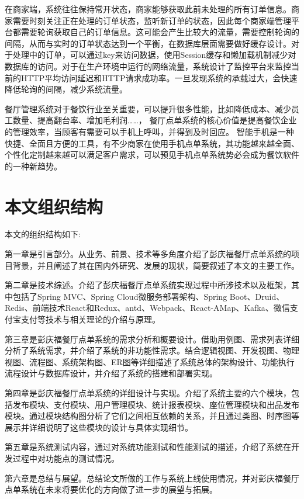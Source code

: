 在商家端，系统往往保持常开状态，商家能够获取此前未处理的所有订单信息。商家需要时刻关注正在处理的订单状态，监听新订单的状态，因此每个商家端管理平台都需要轮询获取自己的订单信息。这可能会产生比较大的流量，需要控制轮询的间隔，从而与实时的订单状态达到一个平衡，在数据库层面需要做好缓存设计。对于处理中的订单，可以通过key来访问数据，使用Session缓存和懒加载机制减少对数据库的访问。对于在生产环境中运行的网络流量，系统设计了监控平台来监控当前的HTTP平均访问延迟和HTTP请求成功率。一旦发现系统的承载过大，会快速降低轮询的间隔，减少系统流量。 

餐厅管理系统对于餐饮行业至关重要，可以提升很多性能，比如降低成本、减少员工数量、提高翻台率、增加毛利润……，
餐厅点单系统的核心价值是提高餐饮企业的管理效率，当顾客有需要可以手机上呼叫，并得到及时回应。
智能手机是一种快捷、全面且方便的工具，有不少商家在使用手机点单系统，其功能越来越全面、个性化定制越来越可以满足客户需求，可以预见手机点单系统势必会成为餐饮软件的一种新趋势。
\section{本文组织结构}
本文的组织结构如下:

第一章是引言部分。从业务、前景、技术等多角度介绍了彭庆福餐厅点单系统的项目背景，并且阐述了其在国内外研究、发展的现状，简要叙述了本文的主要工作。

第二章是技术综述。介绍了彭庆福餐厅点单系统实现过程中所涉技术以及框架，其中包括了Spring MVC、Spring Cloud微服务部署架构、Spring Boot、Druid、Redis、前端技术React和Redux、antd、Webpack、React-AMap、Kafka、微信支付宝支付等技术与相关理论的介绍与原理。 

第三章是彭庆福餐厅点单系统的需求分析和概要设计。借助用例图、需求列表详细分析了系统需求，并介绍了系统的非功能性需求。结合逻辑视图、开发视图、物理视图、流程图、系统架构图、ER图等详细描述了系统总体的架构设计、功能执行流程设计与数据库设计，并介绍了系统的搭建和部署实现。 

第四章是彭庆福餐厅点单系统的详细设计与实现。介绍了系统主要的六个模块，包括发布模块、支付模块、用户管理模块、统计报表模块、座位管理模块和出品发布模块。通过模块结构图分析了它们之间相互依赖的关系，并且通过类图、时序图等展示并详细说明了这些模块的设计与具体实现细节。

第五章是系统测试内容，通过对系统功能测试和性能测试的描述，介绍了系统在开发过程中对功能点的测试情况。 

第六章是总结与展望。总结论文所做的工作与系统上线使用情况，并对彭庆福餐厅点单系统在未来将要优化的方向做了进一步的展望与拓展。



